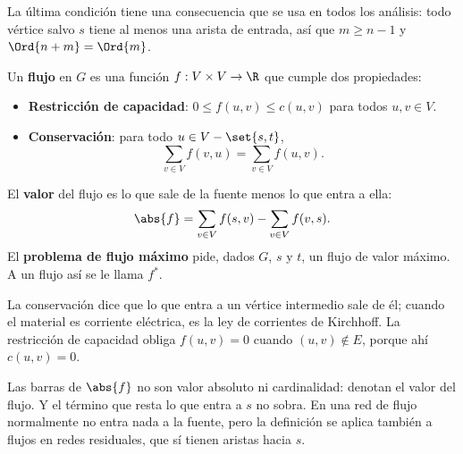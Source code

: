 \documentclass[11pt,letterpaper]{article}
\begin{document}
La última condición tiene una consecuencia que se usa en todos los
análisis: todo vértice salvo $s$ tiene al menos una arista de entrada,
así que $m \ge n - 1$ y $\Ord{n + m} = \Ord{m}$.

\begin{definicion}[Flujo]
  Un \textbf{flujo} en $G$ es una función $f : V \times V \to \R$ que
  cumple dos propiedades:
  \begin{itemize}
    \item \textbf{Restricción de capacidad}: $0 \le f(u, v) \le
          c(u, v)$ para todos $u, v \in V$.
    \item \textbf{Conservación}: para todo $u \in V - \set{s, t}$,
          \[
            \sum_{v \in V} f(v, u) = \sum_{v \in V} f(u, v) .
          \]
  \end{itemize}
  El \textbf{valor} del flujo es lo que sale de la fuente menos lo que
  entra a ella:
  \[
    \abs{f} = \sum_{v \in V} f(s, v) - \sum_{v \in V} f(v, s) .
  \]
  El \textbf{problema de flujo máximo} pide, dados $G$, $s$ y $t$, un
  flujo de valor máximo. A un flujo así se le llama $f^*$.
\end{definicion}

La conservación dice que lo que entra a un vértice intermedio sale de
él; cuando el material es corriente eléctrica, es la ley de corrientes
de Kirchhoff. La restricción de capacidad obliga $f(u, v) = 0$ cuando
$(u, v) \notin E$, porque ahí $c(u, v) = 0$.

\begin{ojo}
  Las barras de $\abs{f}$ no son valor absoluto ni cardinalidad:
  denotan el valor del flujo. Y el término que resta lo que entra a
  $s$ no sobra. En una red de flujo normalmente no entra nada a la
  fuente, pero la definición se aplica también a flujos en redes
  residuales, que sí tienen aristas hacia $s$.
\end{ojo}
\end{document}
